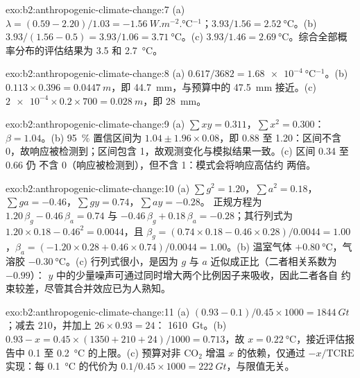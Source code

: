 \begin{solution}{exo:b2:anthropogenic-climate-change:7}
(a) $\lambda = (0.59 - 2.20)/1.03 = \qty{-1.56}{W.m^{-2}.\celsius^{-1}}$；$3.93/1.56 =
\qty{2.52}{\celsius}$。(b) $3.93/(1.56 - 0.5) = 3.93/1.06 = \qty{3.71}{\celsius}$。(c) $3.93/1.46 =
\qty{2.69}{\celsius}$。综合全部概率分布的评估结果为 3.5 和 \qty{2.7}{\celsius}。
\end{solution}

\begin{solution}{exo:b2:anthropogenic-climate-change:8}
(a) $0.617/3682 = \qty{1.68e-4}{\celsius^{-1}}$。(b) $0.113 \times 0.396 = \qty{0.0447}{m}$，即
\qty{44.7}{mm}，与预算中的 \qty{47.5}{mm} 接近。(c) $\num{2e-4} \times 0.2 \times 700 =
\qty{0.028}{m}$，即 \qty{28}{mm}。
\end{solution}

\begin{solution}{exo:b2:anthropogenic-climate-change:9}
(a) $\sum xy = 0.311$，$\sum x^2 = 0.300$：$\beta = 1.04$。(b) \qty{95}{\percent} 置信区间为
$1.04 \pm 1.96 \times 0.08$，即 0.88 至 1.20：区间不含 0，故响应被检测到；区间包含
1，故观测变化与模拟结果一致。(c) 区间 0.34 至 0.66 仍
不含 0（响应被检测到），但不含 1：模式会将响应高估约
两倍。
\end{solution}

\begin{solution}{exo:b2:anthropogenic-climate-change:10}
(a) $\sum g^2 = 1.20$，$\sum a^2 = 0.18$，$\sum ga = -0.46$，$\sum gy = 0.74$，$\sum ay = -0.28$。
正规方程为 $1.20\,\beta_g - 0.46\,\beta_a = 0.74$ 与 $-0.46\,\beta_g + 0.18\,\beta_a
= -0.28$；其行列式为 $1.20 \times 0.18 - 0.46^2 = 0.0044$，且 $\beta_g = (0.74 \times
0.18 - 0.46 \times 0.28)/0.0044 = 1.00$，$\beta_a = (-1.20 \times 0.28 + 0.46 \times 0.74)/0.0044 =
1.00$。(b) 温室气体 $+\qty{0.80}{\celsius}$，气溶胶 $-\qty{0.30}{\celsius}$。(c)
行列式很小，是因为 $g$ 与 $a$ 近似成正比（二者相关系数为 $-0.99$）：
$y$ 中的少量噪声可通过同时增大两个比例因子来吸收，因此二者各自
约束较差，尽管其合并效应已为人熟知。
\end{solution}

\begin{solution}{exo:b2:anthropogenic-climate-change:11}
(a) $(0.93 - 0.1)/0.45 \times 1000 = \qty{1844}{Gt}$；减去 210，并加上 $26 \times 0.93 = 24$：
\qty{1610}{Gt}。(b) $0.93 - x = 0.45 \times (1350 + 210 + 24)/1000 = 0.713$，故 $x =
\qty{0.22}{\celsius}$，接近评估报告中 0.1 至 \qty{0.2}{\celsius} 的上限。(c)
预算对非 CO$_2$ 增温 $x$ 的依赖，仅通过 $-x/\text{TCRE}$ 实现：每
\qty{0.1}{\celsius} 的代价为 $0.1/0.45 \times 1000 = \qty{222}{Gt}$，与限值无关。
\end{solution}

